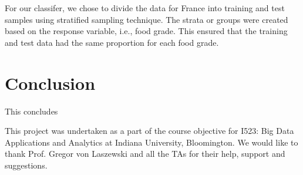 \documentclass[sigconf]{acmart}
\begin{document}
For our classifer, we chose to divide the data for France into training and test samples using stratified sampling technique. The strata or groups were created based on the response variable, i.e., food grade. This ensured that the training and test data had the same proportion for each food grade.

\section{Conclusion}
This concludes

\begin{acks}
This project was undertaken as a part of the course objective for I523: Big Data Applications and Analytics at Indiana
University, Bloomington. We would like to thank Prof. Gregor
von Laszewski and all the TAs for their help, support and suggestions. 

\end{acks}


 
\end{document}
